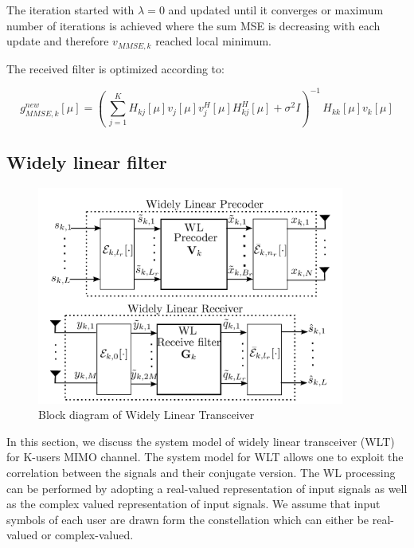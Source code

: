 \documentclass[12pt,a4paper,notitlepage,twoside,headsepline]{scrartcl}
\begin{document}
The iteration started with $\lambda = 0$ and updated until it converges or maximum number of iterations is achieved where the sum MSE is decreasing with each update and therefore $v_{MMSE,k}$ reached local minimum.

The received filter is optimized according to:

\begin{equation}
	g_{MMSE, k}^{new}[\mu] = ( \, \sum_{j=1}^{K}{H_{kj}[\mu] v_j[\mu] v_j^H[\mu] H_{kj}^H[\mu] + \sigma^2 I})^{-1} \, H_{kk}[\mu] v_k[\mu]
\end{equation}


\subsection{Widely linear filter}

\begin{figure}[!ht]
\begin{center}
\includegraphics[width=0.9\textwidth]{figures/wl_system_model.png}
\end{center}
\caption{Block diagram of Widely Linear Transceiver} 
\label{fig:example}
\end{figure}

In this section, we discuss the system model of widely linear transceiver (WLT) for K-users MIMO channel. The system model for WLT allows one to exploit the correlation between the signals and their conjugate version. The WL processing can be performed by adopting a real-valued representation of input signals as well as the complex valued representation of input signals. We assume that input symbols of each user are drawn form the constellation which can either be real-valued or complex-valued. 
\end{document}
